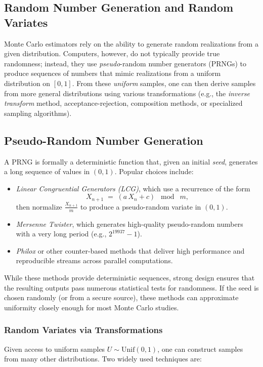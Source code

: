 \subsection{Random Number Generation and Random Variates}
Monte Carlo estimators rely on the ability to generate random realizations from a given distribution. Computers, however, do not typically provide true randomness; instead, they use \emph{pseudo}-random number generators (PRNGs) to produce sequences of numbers that mimic realizations from a uniform distribution on \([0,1]\). From these \emph{uniform} samples, one can then derive samples from more general distributions using various transformations (e.g., the \emph{inverse transform} method, acceptance-rejection, composition methods, or specialized sampling algorithms).

\subsection{Pseudo-Random Number Generation}
A PRNG is formally a deterministic function that, given an initial \emph{seed}, generates a long sequence of values in \((0,1)\). Popular choices include:
\begin{itemize}
\item \emph{Linear Congruential Generators (LCG)}, which use a recurrence of the form
\[
X_{n+1}
\;=\;
(a\,X_n + c)
\;\bmod\; m,
\]
then normalize \(\frac{X_{n+1}}{m}\) to produce a pseudo-random variate in \((0,1)\).
\item \emph{Mersenne Twister}, which generates high-quality pseudo-random numbers with a very long period (e.g., \(2^{19937}-1\)).
\item \emph{Philox} or other counter-based methods that deliver high performance and reproducible streams across parallel computations.
\end{itemize}

While these methods provide deterministic sequences, strong design ensures that the resulting outputs pass numerous statistical tests for randomness. If the seed is chosen randomly (or from a secure source), these methods can approximate uniformity closely enough for most Monte Carlo studies.

\subsubsection{Random Variates via Transformations}
Given access to uniform samples \(U\sim \mathrm{Unif}(0,1)\), one can construct samples from many other distributions. Two widely used techniques are:


